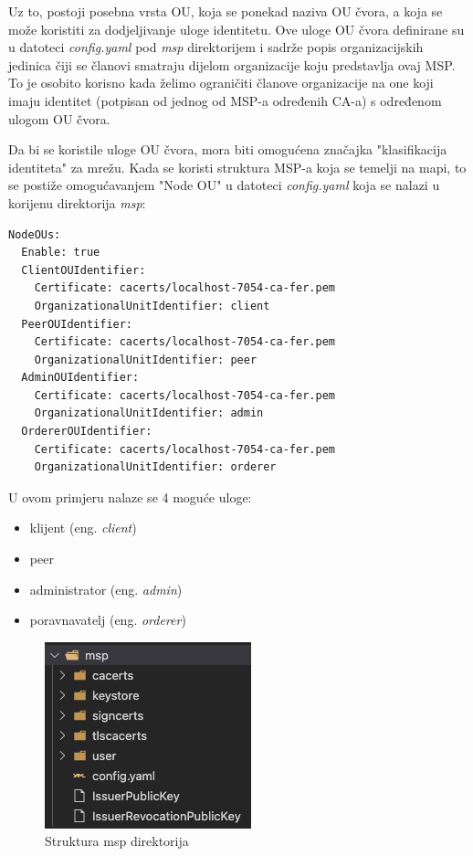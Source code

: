 \documentclass[times, utf8, diplomski]{fer}
\begin{document}
Uz to, postoji posebna vrsta OU, koja se ponekad naziva OU čvora, a koja se može koristiti za dodjeljivanje uloge identitetu. Ove uloge OU čvora definirane su u datoteci \textit{config.yaml} pod \textit{msp} direktorijem i sadrže popis organizacijskih jedinica čiji se članovi smatraju dijelom organizacije koju predstavlja ovaj MSP. To je osobito korisno kada želimo ograničiti članove organizacije na one koji imaju identitet (potpisan od jednog od MSP-a određenih CA-a) s određenom ulogom OU čvora. 

Da bi se koristile uloge OU čvora, mora biti omogućena značajka "klasifikacija identiteta" za mrežu. Kada se koristi struktura MSP-a koja se temelji na mapi, to se postiže omogućavanjem "Node OU" u datoteci \textit{config.yaml} koja se nalazi u korijenu direktorija \textit{msp}:

\begin{verbatim}
NodeOUs:
  Enable: true
  ClientOUIdentifier:
    Certificate: cacerts/localhost-7054-ca-fer.pem
    OrganizationalUnitIdentifier: client
  PeerOUIdentifier:
    Certificate: cacerts/localhost-7054-ca-fer.pem
    OrganizationalUnitIdentifier: peer
  AdminOUIdentifier:
    Certificate: cacerts/localhost-7054-ca-fer.pem
    OrganizationalUnitIdentifier: admin
  OrdererOUIdentifier:
    Certificate: cacerts/localhost-7054-ca-fer.pem
    OrganizationalUnitIdentifier: orderer
\end{verbatim}

U ovom primjeru nalaze se 4 moguće uloge:
\begin{itemize}
\item klijent (eng.  \textit{client})
\item peer
\item administrator (eng.  \textit{admin})
\item poravnavatelj (eng.  \textit{orderer})
\end{itemize}

\begin{figure}[htb]
\centering
\includegraphics{imgs/msp-folder.png}
\caption{Struktura msp direktorija}
\label{fig:msp}
\end{figure}
\end{document}
